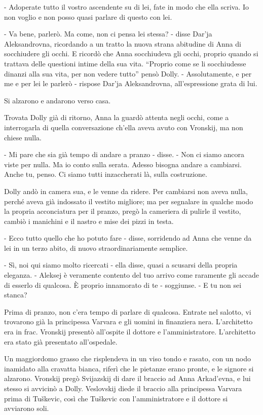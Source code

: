 - Adoperate tutto il vostro ascendente su di lei, fate in modo che ella scriva. Io non voglio e non posso quasi parlare di questo con lei. 

- Va bene, parlerò. Ma come, non ci pensa lei stessa? - disse Dar'ja Aleksandrovna, ricordando a un tratto la nuova strana abitudine di Anna di socchiudere gli occhi. E ricordò che Anna socchiudeva gli occhi, proprio quando si trattava delle questioni intime della sua vita. ``Proprio come se li socchiudesse dinanzi alla sua vita, per non vedere tutto'' pensò Dolly. - Assolutamente, e per me e per lei le parlerò - rispose Dar'ja Aleksandrovna, all'espressione grata di lui. 

Si alzarono e andarono verso casa. 

\label{xxii-5} 

Trovata Dolly già di ritorno, Anna la guardò attenta negli occhi, come a interrogarla di quella conversazione ch'ella aveva avuto con Vronskij, ma non chiese nulla. 

- Mi pare che sia già tempo di andare a pranzo - disse. - Non ci siamo ancora viste per nulla. Ma io conto sulla serata. Adesso bisogna andare a cambiarsi. Anche tu, penso. Ci siamo tutti inzaccherati là, sulla costruzione. 

Dolly andò in camera sua, e le venne da ridere. Per cambiarsi non aveva nulla, perché aveva già indossato il vestito migliore; ma per segnalare in qualche modo la propria acconciatura per il pranzo, pregò la cameriera di pulirle il vestito, cambiò i manichini e il nastro e mise dei pizzi in testa. 

- Ecco tutto quello che ho potuto fare - disse, sorridendo ad Anna che venne da lei in un terzo abito, di nuovo straordinariamente semplice. 

- Sì, noi qui siamo molto ricercati - ella disse, quasi a scusarsi della propria eleganza. - Aleksej è veramente contento del tuo arrivo come raramente gli accade di esserlo di qualcosa. È proprio innamorato di te - soggiunse. - E tu non sei stanca? 

Prima di pranzo, non c'era tempo di parlare di qualcosa. Entrate nel salotto, vi trovarono già la principessa Varvara e gli uomini in finanziera nera. L'architetto era in frac. Vronskij presentò all'ospite il dottore e l'amministratore. L'architetto era stato già presentato all'ospedale. 

Un maggiordomo grasso che risplendeva in un viso tondo e rasato, con un nodo inamidato alla cravatta bianca, riferì che le pietanze erano pronte, e le signore si alzarono. Vronskij pregò Svijazskij di dare il braccio ad Anna Arkad'evna, e lui stesso si avvicinò a Dolly. Veslovskij diede il braccio alla principessa Varvara prima di Tuškevic, così che Tuškevic con l'amministratore e il dottore si avviarono soli. 

